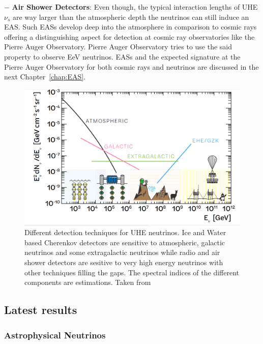\begin{description}
  \item $-$ \textbf{Air Shower Detectors}: Even though, the typical interaction lengths of UHE$\nu_s$ are way larger than the atmospheric depth the neutrinos can still induce an EAS. Such EASs develop deep into the atmosphere in comparison to cosmic rays offering a distinguishing aspect for detection at cosmic ray observatories like the Pierre Auger Observatory. Pierre Auger Observatory tries to use the said property to observe EeV neutrinos. EASs and the expected signature at the Pierre Auger Observatory for both cosmic rays and neutrinos are discussed in the next Chapter~\ref{chap:EAS}.   

  \end{description}

  \begin{figure}[t!]
    \centering
    \includegraphics[width=14.5cm]{thesis_figures/CRnNu/UHE_nu_techniques.png}
    \caption{Different detection techniques for UHE neutrinos. Ice and Water based Cherenkov detectors are sensitive to atmospheric, galactic neutrinos and some extragalactic neutrinos while radio and air shower detectors are sesitive to very high energy neutrinos with other techniques filling the gaps. The spectral indices of the different components are estimations. Taken from~\cite{Arguelles:2024xkx}}
    \label{fig:UHE-nu-techniques}
  \end{figure}

\subsection{Latest results}
  \label{subsec:Nuresults}
  
\subsubsection*{Astrophysical Neutrinos}

